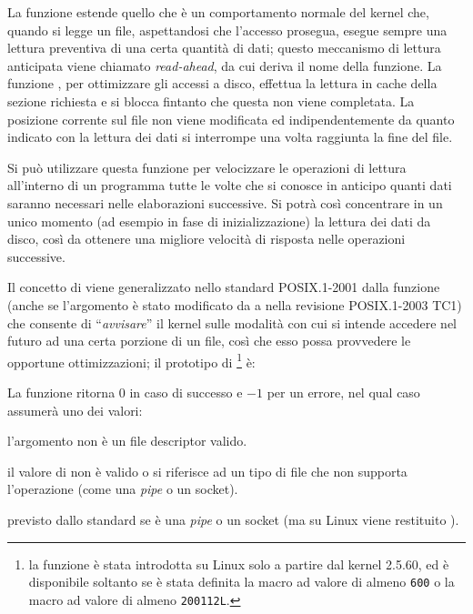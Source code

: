 La funzione estende quello che è un comportamento normale del kernel che,
quando si legge un file, aspettandosi che l'accesso prosegua, esegue sempre
una lettura preventiva di una certa quantità di dati; questo meccanismo di
lettura anticipata viene chiamato \textit{read-ahead}, da cui deriva il nome
della funzione. La funzione , per ottimizzare gli accessi a
disco, effettua la lettura in cache della sezione richiesta e si blocca
fintanto che questa non viene completata.  La posizione corrente sul file non
viene modificata ed indipendentemente da quanto indicato con  la
lettura dei dati si interrompe una volta raggiunta la fine del file.

Si può utilizzare questa funzione per velocizzare le operazioni di lettura
all'interno di un programma tutte le volte che si conosce in anticipo quanti
dati saranno necessari nelle elaborazioni successive. Si potrà così
concentrare in un unico momento (ad esempio in fase di inizializzazione) la
lettura dei dati da disco, così da ottenere una migliore velocità di risposta
nelle operazioni successive.


Il concetto di  viene generalizzato nello standard
POSIX.1-2001 dalla funzione  (anche se
l'argomento  è stato modificato da  a 
nella revisione POSIX.1-2003 TC1) che consente di ``\textsl{avvisare}'' il
kernel sulle modalità con cui si intende accedere nel futuro ad una certa
porzione di un file, così che esso possa provvedere le opportune
ottimizzazioni; il prototipo di \footnote{la funzione è
  stata introdotta su Linux solo a partire dal kernel 2.5.60, ed è disponibile
  soltanto se è stata definita la macro  ad valore di
  almeno \texttt{600} o la macro  ad valore di
  almeno \texttt{200112L}.} è:


\begin{funcproto}{
}

{La funzione ritorna $0$ in caso di successo e $-1$ per un errore, nel qual
  caso  assumerà uno dei valori: 
  \begin{errlist}
    \item[\errcode{EBADF}] l'argomento  non è un file descriptor
      valido.
    \item[\errcode{EINVAL}] il valore di  non è valido o
       si riferisce ad un tipo di file che non supporta l'operazione
      (come una \textit{pipe} o un socket).
    \item[\errcode{ESPIPE}] previsto dallo standard se  è una
      \textit{pipe} o un socket (ma su Linux viene restituito
      ).
  \end{errlist}
}
\end{funcproto}

